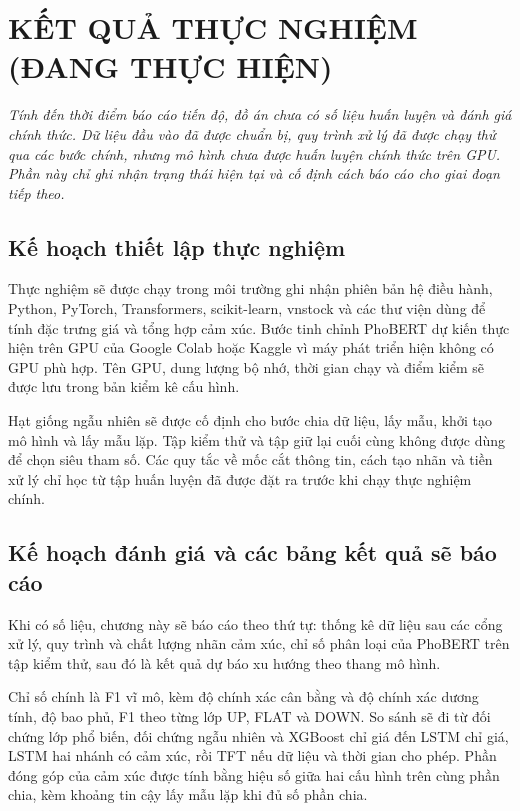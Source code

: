\chapter{KẾT QUẢ THỰC NGHIỆM (ĐANG THỰC HIỆN)}
\label{ch:ket-qua}

\emph{Tính đến thời điểm báo cáo tiến độ, đồ án chưa có số liệu huấn luyện và đánh giá
chính thức. Dữ liệu đầu vào đã được chuẩn bị, quy trình xử lý đã được chạy thử qua các
bước chính, nhưng mô hình chưa được huấn luyện chính thức trên GPU. Phần này chỉ ghi
nhận trạng thái hiện tại và cố định cách báo cáo cho giai đoạn tiếp theo.}

\section{Kế hoạch thiết lập thực nghiệm}
\label{sec:kq-setup}

Thực nghiệm sẽ được chạy trong môi trường ghi nhận phiên bản hệ điều hành, Python,
PyTorch, Transformers, scikit-learn, vnstock và các thư viện dùng để tính đặc trưng
giá và tổng hợp cảm xúc. Bước tinh chỉnh PhoBERT dự kiến thực hiện trên GPU của Google
Colab hoặc Kaggle
vì máy phát triển hiện không có GPU phù hợp. Tên GPU, dung lượng bộ nhớ, thời gian chạy
và điểm kiểm sẽ được lưu trong bản kiểm kê cấu hình.

Hạt giống ngẫu nhiên sẽ được cố định cho bước chia dữ liệu, lấy mẫu, khởi tạo mô hình và
lấy mẫu lặp. Tập kiểm thử và tập giữ lại cuối cùng không được dùng để chọn siêu tham số.
Các quy tắc về mốc cắt thông tin, cách tạo nhãn và tiền xử lý chỉ học từ tập huấn luyện
đã được đặt ra trước khi chạy thực nghiệm chính.

\section{Kế hoạch đánh giá và các bảng kết quả sẽ báo cáo}
\label{sec:kq-plan}

Khi có số liệu, chương này sẽ báo cáo theo thứ tự: thống kê dữ liệu sau các cổng xử lý,
quy trình và chất lượng nhãn cảm xúc, chỉ số phân loại của PhoBERT trên tập kiểm thử,
sau đó là kết quả dự báo xu hướng theo thang mô hình.

Chỉ số chính là F1 vĩ mô, kèm độ chính xác cân bằng và độ chính xác dương tính, độ bao phủ, F1 theo từng lớp
UP, FLAT và DOWN. So sánh sẽ đi từ đối chứng lớp phổ biến, đối chứng ngẫu nhiên và XGBoost chỉ giá đến LSTM chỉ
giá, LSTM hai nhánh có cảm xúc, rồi TFT nếu dữ liệu và thời gian cho phép. Phần đóng
góp của cảm xúc được tính bằng hiệu số giữa hai cấu hình trên cùng phần chia, kèm khoảng tin
cậy lấy mẫu lặp khi đủ số phần chia.

